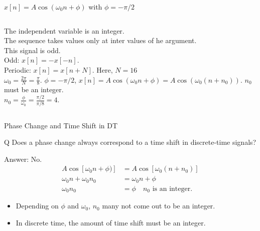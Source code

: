 \begin{frame}[plain]{$x[n] = A\cos(\omega_0n+\phi)$ with $\phi = -\pi/2$}
    {
        \begin{columns}[t]
            {
                \centering
                
            }
            {
                \noindent The independent variable is an integer.\\
                The sequence takes values only at inter values of he argument.\\
                This signal is \alert{odd}. \\[12pt]
                Odd: $x[n] = -x[-n]$.\\
                Periodic: $x[n] = x[n+N]$. Here, $N=16$\\
                $\omega_0 = \frac{2\pi}{N} = \frac{\pi}{8}$.
                $\phi= -\pi/2$, $x[n] = A\cos(\omega_0n+\phi) = A\cos(\omega_0(n+n_0))$. $n_0$ must be an integer.\\
                $n_0 = \frac{\phi}{\omega_0} = \frac{\pi/2}{\pi/8} = 4$.


            }
        \end{columns}
    }
\end{frame}


\begin{frame}{Phase Change and Time Shift in DT}
    \begin{block}{Q}
        Does a phase change always correspond to a time shift in discrete-time signals?
    \end{block}
    \pause
    {
        Answer: No.\\
        \begin{align*}
          A\cos[\omega_0n+ \phi)] &=  A\cos[\omega_0(n+n_0)]\\
          \omega_0n + \omega_0n_0 &= \omega_0n + \phi \\
          \omega_0n_0 &= \phi\quad n_0 \text{ is an integer}.
        \end{align*}

        \begin{itemize}
          \item Depending on $\phi$ and $\omega_0$, $n_0$ many not come out to be an \alert{integer}.
          \item In discrete time, the amount of time shift must be an integer.
        \end{itemize}
    }
\end{frame}

